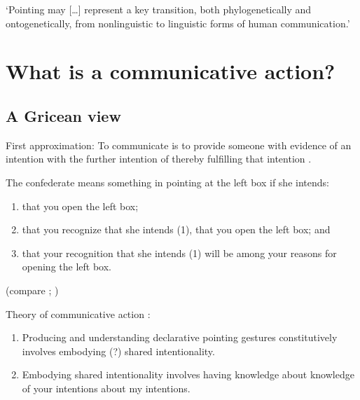 \documentclass[12pt]{extarticle}
\begin{document}
\begin{multicols}{3}
‘Pointing may […] represent a key transition, both phylogenetically and ontogenetically, from nonlinguistic to linguistic forms of human communication.’ \citep[p.\ 720]{Tomasello:2007fi}
 
 
 
\section{What is a communicative action?}
 
\subsection{A Gricean view}
 
First approximation: To communicate is to provide someone with evidence of an intention with the further intention of thereby fulfilling that intention
\citep[compare][chapter 14]{Grice:1989ha}.
 
The confederate means something in pointing at the left box if she intends:
 
\begin{enumerate}
 
\item
 
that you open the left box;
 
\item
 
that you recognize that she intends (1), that you open the left box; and
 
\item
 
that your recognition that she intends (1) will be among your reasons for opening the left box.
 
\end{enumerate}
 
(compare \citealp[p.\ 151]{Grice:1969pv}; \citealp[p.\ 544]{Neale:1992uw})
 
Theory of communicative action \citep[compare][]{Tomasello:2007fi}:
 
\begin{enumerate}
 
\item
 
Producing and understanding declarative pointing gestures constitutively involves embodying (?) shared intentionality.
 
\item
 
Embodying shared intentionality involves having knowledge about knowledge of your intentions about my intentions.
 

\end{enumerate}
\end{multicols}
\end{document}
